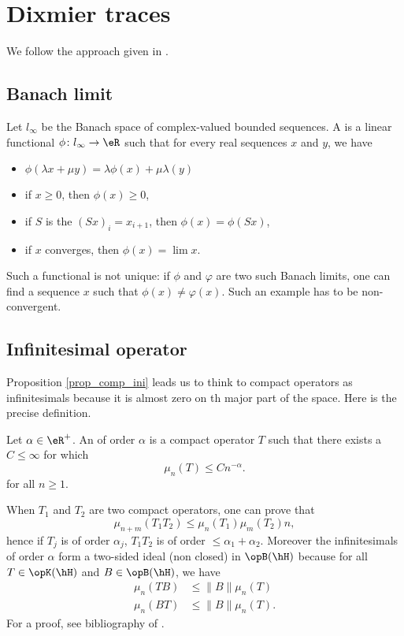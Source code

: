 %
   \section{Dixmier traces}
%

We follow the approach given in \cite{Landi,itoNCG_Varilly}.

\subsection{Banach limit}

Let $l_{\infty}$ be the Banach space of complex-valued bounded sequences. A  is a linear functional $\phi\colon l_{\infty}\to \eR$ such that for every real sequences $x$ and $y$, we have
\begin{itemize}
\item $\phi(\lambda x+\mu y)=\lambda\phi(x)+\mu\lambda(y)$
\item if $x\geq 0$, then $\phi(x)\geq 0$,
\item if $S$ is the  $(Sx)_i=x_{i+1}$, then $\phi(x)=\phi(Sx)$,
\item if $x$ converges, then $\phi(x)=\lim x$.
\end{itemize}
Such a functional is not unique: if $\phi$ and $\varphi$ are two such Banach limits, one can find a sequence $x$ such that $\phi(x)\neq\varphi(x)$. Such an example has to be non-convergent.

\subsection{Infinitesimal operator}

Proposition \ref{prop_comp_ini} leads us to think to compact operators as infinitesimals because it is almost zero on th major part of the space. Here is the precise definition.

\begin{definition}
Let $\alpha\in\eR^+$. An  of order $\alpha$ is a compact operator $T$ such that there exists a $C\leq\infty$ for which
\[ 
  \mu_n(T)\leq Cn^{-\alpha}.
\]
for all $n\geq 1$.
\end{definition}

When $T_1$ and $T_2$ are two compact operators, one can prove that 
\[ 
  \mu_{n+m}(T_1T_2)\leq\mu_n(T_1)\mu_m(T_2)n,
\]
hence if $T_j$ is of order $\alpha_j$, $T_1T_2$ is of order $\leq\alpha_1+\alpha_2$. Moreover the infinitesimals of order $\alpha$ form a two-sided ideal (non closed) in $\opB(\hH)$ because for all $T\in\opK(\hH)$ and $B\in\opB(\hH)$, we have
\begin{equation}
\begin{split}
\mu_n(TB)&\leq\| B \|\mu_n(T)\\
\mu_n(BT)&\leq\| B \|\mu_n(T).
\end{split}
\end{equation}
For a proof, see bibliography of \cite{Landi}.

